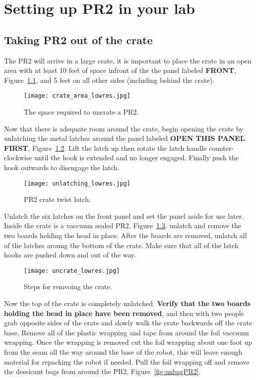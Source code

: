\chapter{Setting up PR2 in your lab}
\section{Taking PR2 out of the crate}
The PR2 will arrive in a large crate, it is important to place the crate in an
open area with at least 10 feet of space infront of the the panel labeled {\bf
  FRONT}, Figure~\ref{fig:crate_space}, and 5 feet on all other
sides (including behind the crate).

\begin{figure}[h!]
\centering
\texttt{[image: crate\_area\_lowres.jpg]}
\caption{The space required to uncrate a PR2.}
\label{fig:crate_space}
\end{figure}

Now that there is adequate room around the crate, begin opening the crate by
unlatching the metal latches around the panel labeled {\bf OPEN THIS PANEL
  FIRST}, Figure~\ref{fig:unlatch}. Lift the latch up then rotate the latch
handle counter-clockwise until the hook is extended and no longer
engaged. Finally push the hook outwards to disengage the latch.

\begin{figure}[h]
\centering
\texttt{[image: unlatching\_lowres.jpg]}
\caption{PR2 crate twist latch.}
\label{fig:unlatch}
\end{figure}

Unlatch the six latches on the front panel and set the panel aside for use
later. Inside the crate is a vaccuum sealed PR2, Figure~\ref{fig:sealPR2},
unlatch and remove the two boards holding the head in place. After the boards
are removed, unlatch all of the latches aroung the bottom of the crate. Make
sure that all of the latch hooks are pushed down and out of the way.

\begin{figure}[h]
\centering
\texttt{[image: uncrate\_lowres.jpg]}
\caption{Steps for remvoing the crate.}
\label{fig:sealPR2}
\end{figure}

Now the top of the crate is completely unlatched. {\bf Verify that the two boards holding the head in place have been removed}, and then with two people grab opposite
sides of the crate and slowly walk the crate backwards off the crate
base. Remove all of the plastic wrapping and tape from around the foil vaccuum
wrapping. Once the wrapping is removed cut the foil wrapping about one foot up
from the seam all the way around the base of the robot, this will leave enough
material for repacking the robot if needed. Pull the foil wrapping off and
remove the dessicant bags from around the PR2, Figure~\ref{fig:unbagPR2}.

